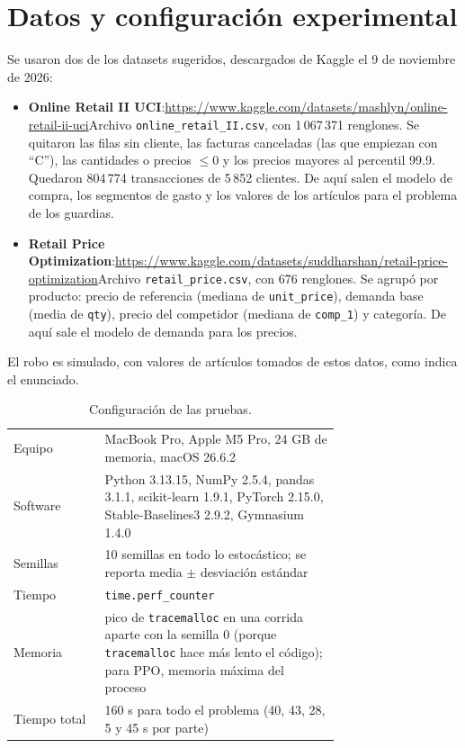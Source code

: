 \section*{Datos y configuración experimental}
\label{p2:sec:datos}

Se usaron dos de los datasets sugeridos, descargados de Kaggle el 9 de noviembre de 2026:
\begin{itemize}[itemsep=1pt]
  \item \textbf{Online Retail II UCI}:\newline \url{https://www.kaggle.com/datasets/mashlyn/online-retail-ii-uci}\newline Archivo \texttt{online\_retail\_II.csv}, con 1\,067\,371 renglones. Se quitaron las filas sin cliente, las facturas canceladas (las que empiezan con ``C''), las cantidades o precios $\le 0$ y los precios mayores al percentil 99.9. Quedaron 804\,774 transacciones de 5\,852 clientes. De aquí salen el modelo de compra, los segmentos de gasto y los valores de los artículos para el problema de los guardias.
  \item \textbf{Retail Price Optimization}:\newline \url{https://www.kaggle.com/datasets/suddharshan/retail-price-optimization}\newline Archivo \texttt{retail\_price.csv}, con 676 renglones. Se agrupó por producto: precio de referencia (mediana de \texttt{unit\_price}), demanda base (media de \texttt{qty}), precio del competidor (mediana de \texttt{comp\_1}) y categoría. De aquí sale el modelo de demanda para los precios.
\end{itemize}
El robo es simulado, con valores de artículos tomados de estos datos, como indica el enunciado.

\begin{table}[H]\centering\small
\begin{tabular}{lp{0.72\linewidth}}\toprule
Equipo & MacBook Pro, Apple M5 Pro, 24 GB de memoria, macOS 26.6.2 \\
Software & Python 3.13.15, NumPy 2.5.4, pandas 3.1.1, scikit-learn 1.9.1, PyTorch 2.15.0, Stable-Baselines3 2.9.2, Gymnasium 1.4.0 \\
Semillas & 10 semillas en todo lo estocástico; se reporta media $\pm$ desviación estándar \\
Tiempo & \texttt{time.perf\_counter} \\
Memoria & pico de \texttt{tracemalloc} en una corrida aparte con la semilla 0 (porque \texttt{tracemalloc} hace más lento el código); para PPO, memoria máxima del proceso \\
Tiempo total & 160 s para todo el problema (40, 43, 28, 5 y 45 s por parte) \\\bottomrule
\end{tabular}
\caption{Configuración de las pruebas.}
\label{p2:tab:setup}
\end{table}

